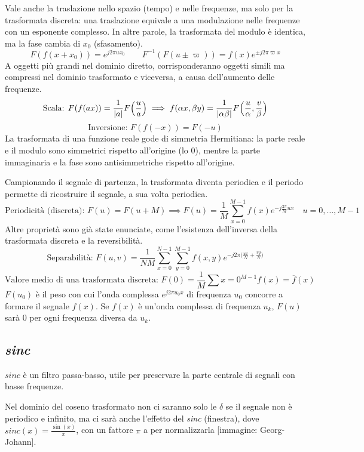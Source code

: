 Vale anche la traslazione nello spazio (tempo) e nelle frequenze, ma solo per la trasformata discreta: una traslazione equivale a una modulazione nelle frequenze con un esponente complesso. In altre parole, la trasformata del modulo è identica, ma la fase cambia di $x_0$ (sfasamento).
$$F(f(x + x_0)) = e^{j2\pi ux_0} \qquad F^{-1}(F(u \pm \varpi)) = f(x)e^{\pm j2\pi \varpi x}$$
A oggetti più grandi nel dominio diretto, corrisponderanno oggetti simili ma compressi nel dominio trasformato e viceversa, a causa dell'aumento delle frequenze. 
$$\text{Scala: } F(f(ax)) = \frac{1}{\left|a\right|} F\Big(\frac{u}{a}\Big) \implies f(\alpha x, \beta y) = \frac{1}{\left|\alpha \beta\right|} F\Big(\frac{u}{\alpha}, \frac{v}{\beta}\Big)$$
$$\text{Inversione: } F(f(-x)) = F(-u)$$
La trasformata di una funzione reale gode di simmetria Hermitiana: la parte reale e il modulo sono simmetrici rispetto all'origine (lo 0), mentre la parte immaginaria e la fase sono antisimmetriche rispetto all'origine.

Campionando il segnale di partenza, la trasformata diventa periodica e il periodo permette di ricostruire il segnale, a sua volta periodica. 
$$\text{Periodicità (discreta): } F(u) = F(u + M) \implies F(u) = \frac{1}{M} \sum_{x=0}^{M-1} f(x)e^{-j\frac{2\pi}{M}ux} \quad u = 0, \dots, M - 1$$
Altre proprietà sono già state enunciate, come l'esistenza dell'inversa della trasformata discreta e la reversibilità.
$$\text{Separabilità: } F(u, v) = \frac{1}{NM} \sum_{x=0}^{N-1} \sum_{y=0}^{M-1} f(x, y) e^{-j2\pi \big(\frac{ux}{N} + \frac{vy}{N}\big)}$$
$$\text{Valore medio di una trasformata discreta: } F(0) = \frac{1}{M} \sum{x=0}^{M-1} f(x) = \overline{f}(x)$$
$F(u_0)$ è il peso con cui l'onda complessa $e^{j2\pi u_0x}$ di frequenza $u_0$ concorre a formare il segnale $f(x)$. Se $f(x)$ è un'onda complessa di frequenza $u_k$, $F(u)$ sarà 0 per ogni frequenza diversa da $u_k$.

\subsection{\textit{sinc}}
$sinc$ è un filtro passa-basso, utile per preservare la parte centrale di segnali con basse frequenze. 

Nel dominio del coseno trasformato non ci saranno solo le $\delta$ se il segnale non è periodico e infinito, ma ci sarà anche l'effetto del \textit{sinc} (finestra), dove $sinc(x) = \frac{\sin(x)}{x}$, con un fattore $\pi$ a per normalizzarla [immagine: Georg-Johann]. 

